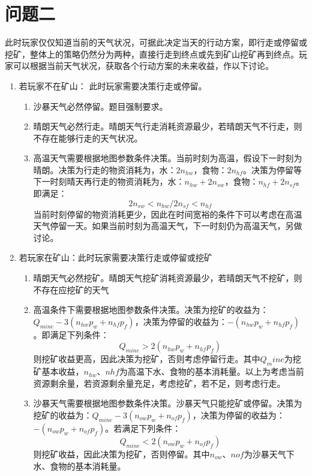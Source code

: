 \documentclass[withoutpre]{cumcmthesis} %
\begin{document}
\section{问题二}
此时玩家仅仅知道当前的天气状况，可据此决定当天的行动方案，即行走或停留或挖矿，整体上的策略仍然分为两种，直接行走到终点或先到矿山挖矿再到终点。玩家可以根据当前天气状况，获取各个行动方案的未来收益，作以下讨论。
\begin{enumerate}
    \item 若玩家不在矿山：
    此时玩家需要决策行走或停留。
    \begin{enumerate}
        \item 沙暴天气必然停留。题目强制要求。
        \item 晴朗天气必然行走。晴朗天气行走消耗资源最少，若晴朗天气不行走，则不存在能够行走的天气状况。
        \item 高温天气需要根据地图参数条件决策。当前时刻为高温，假设下一时刻为晴朗。决策为行走的物资消耗为，水：$2n_{hw}$，食物：$2n_{hf}$。决策为停留等下一时刻晴天再行走的物资消耗为，水：$n_{hw} + 2n_{sw}$，食物：$n_{hf} + 2n_{sf}$。即满足：
        \begin{equation}
            2n_{sw} < n_{hw} /
            2n_{sf} < n_{hf}
            \label{equa:1}
        \end{equation}
        当前时刻停留的物资消耗更少，因此在时间宽裕的条件下可以考虑在高温天气停留一天。如果当前时刻为高温天气，下一时刻仍为高温天气，另做讨论。
    \end{enumerate}
    \item 若玩家在矿山：此时玩家需要决策行走或停留或挖矿
    \begin{enumerate}
        \item 晴朗天气必然挖矿。晴朗天气挖矿消耗资源最少，若晴朗天气不挖矿，则不存在应挖矿的天气
        \item 高温条件下需要根据地图参数条件决策。决策为挖矿的收益为：$Q_{mine} - 3(n_{hw}p_w + n_{hf}p_f)$，决策为停留的收益为：$-(n_{hw}p_w + n_{hf}p_f)$。即满足下列条件：
        \begin{equation}
            Q_{mine} > 2(n_{hw}p_w + n_{hf}p_f)
            \label{equa:2}
        \end{equation}
        则挖矿收益更高，因此决策为挖矿，否则考虑停留行走。其中$Q_mine$为挖矿基本收益，$n_{hw}$、$n{hf}$为高温下水、食物的基本消耗量。以上为考虑当前资源剩余量，若资源剩余量充足，考虑挖矿，若不足，则考虑行走。
        \item 沙暴天气需要根据地图参数条件决策。沙暴天气只能挖矿或停留。决策为挖矿的收益为：$Q_{mine} - 3(n_{ow}p_w + n_{of}p_f)$，决策为停留的收益为：$-(n_{ow}p_w + n_{of}p_f)$。若满足下列条件：
        \begin{equation}
            Q_{mine} < 2(n_{ow}p_w + n_{of}p_f)
            \label{equa:3}
        \end{equation}
        则挖矿收益，因此决策为挖矿，否则停留。其中$n_{ow}$、$n{of}$为沙暴天气下水、食物的基本消耗量。
    \end{enumerate}
\end{enumerate}
\end{document}
